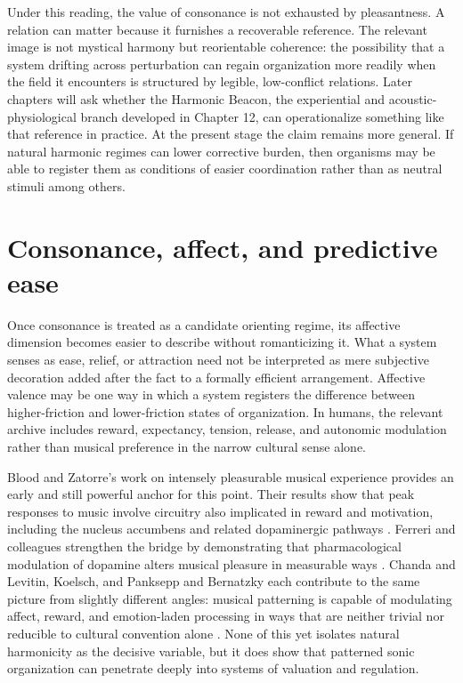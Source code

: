 Under this reading, the value of consonance is not exhausted by pleasantness. A relation can matter because it furnishes a recoverable reference. The relevant image is not mystical harmony but reorientable coherence: the possibility that a system drifting across perturbation can regain organization more readily when the field it encounters is structured by legible, low-conflict relations. Later chapters will ask whether the Harmonic Beacon, the experiential and acoustic-physiological branch developed in Chapter 12, can operationalize something like that reference in practice. At the present stage the claim remains more general. If natural harmonic regimes can lower corrective burden, then organisms may be able to register them as conditions of easier coordination rather than as neutral stimuli among others.

\section{Consonance, affect, and predictive ease}

Once consonance is treated as a candidate orienting regime, its affective dimension becomes easier to describe without romanticizing it. What a system senses as ease, relief, or attraction need not be interpreted as mere subjective decoration added after the fact to a formally efficient arrangement. Affective valence may be one way in which a system registers the difference between higher-friction and lower-friction states of organization. In humans, the relevant archive includes reward, expectancy, tension, release, and autonomic modulation rather than musical preference in the narrow cultural sense alone.

Blood and Zatorre's work on intensely pleasurable musical experience provides an early and still powerful anchor for this point. Their results show that peak responses to music involve circuitry also implicated in reward and motivation, including the nucleus accumbens and related dopaminergic pathways \parencite{blood_2001}. Ferreri and colleagues strengthen the bridge by demonstrating that pharmacological modulation of dopamine alters musical pleasure in measurable ways \parencite{ferreri_2019}. Chanda and Levitin, Koelsch, and Panksepp and Bernatzky each contribute to the same picture from slightly different angles: musical patterning is capable of modulating affect, reward, and emotion-laden processing in ways that are neither trivial nor reducible to cultural convention alone \parencite{chanda_2013, koelsch_2014, panksepp_2002}. None of this yet isolates natural harmonicity as the decisive variable, but it does show that patterned sonic organization can penetrate deeply into systems of valuation and regulation.

